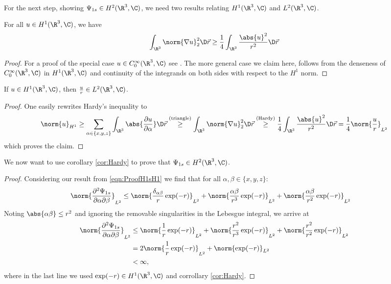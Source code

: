 For the next step, showing $\Psi_{1s} \in H^2(\R^3, \C)$,
we need two results relating $H^1(\R^3, \C)$ and $L^2(\R^3, \C)$.
\begin{prop}
	\label{prop:Hardy}
	For all $u \in H^1(\R^3, \C)$, we have
	\[ \int_{\R^3} \norm{\nabla u}_2^2 \D\vec{r}
		\geq \frac{1}{4} \int_{\R^3} \frac{\abs{u}^2}{r^2} \D\vec{r} \]
	\begin{proof}
		For a proof of the special case $u \in C_0^\infty(\R^3, \C)$
		see \cite[p. 30]{Helffer2013}.
		The more general case we claim here,
		follows from the denseness of $C_0^\infty(\R^3, \C)$ in $H^1(\R^3, \C)$
		and continuity of the integrands on both sides
		with respect to the $H^1$ norm.
	\end{proof}
\end{prop}

\begin{cor}
	\label{cor:Hardy}
	If $u \in H^1(\R^3, \C)$, then $\frac{u}{r} \in L^2(\R^3, \C)$.
	\begin{proof}
		One easily rewrites Hardy's inequality to
		\[
			\norm{u}_{H^1} \geq  \sum_{\alpha\in\{x,y,z\}} \int_{\R^3} \abs{\frac{\partial u}{\partial \alpha}} \D\vec{r}
			\stackrel{\text{(triangle)}}{\geq}
			\int_{\R^3} \norm{\nabla u}_2^2 \D\vec{r}
			\stackrel{\text{(Hardy)}}{\geq}
			\frac{1}{4} \int_{\R^3} \frac{\abs{u}^2}{r^2} \D\vec{r}
			= \frac{1}{4} \norm{\frac{u}{r}}_{L^2}
		\]
		which proves the claim.
	\end{proof}
\end{cor}

\begin{exmp}
	\label{exmp:H1sH2}
	We now want to use corollary \vref{cor:Hardy} to prove that
	$\Psi_{1s} \in H^2(\R^3,\C)$.
	\begin{proof}
		Considering our result from \eqref{eqn:ProofH1sH1}
		we find that for all $\alpha, \beta \in \{x,y,z\}$:
		\begin{align*}
			\norm{\frac{\partial^2 \Psi_{1s}}{\partial \alpha \partial \beta}}_{L^2}
			&\leq \norm{ \frac{\delta_{\alpha\beta}}{r} \exp(-r)}_{L^2}
			+ \norm{\frac{\alpha\beta}{r^3}\exp(-r)}_{L^2}
			+ \norm{\frac{\alpha\beta}{r^2}\exp(-r)}_{L^2}
		\end{align*}
		Noting $\abs{\alpha\beta} \le r^2$
		and ignoring the removable singularities in the Lebesgue integral,
		we arrive at
		\begin{align*}
			\norm{\frac{\partial^2 \Psi_{1s}}{\partial \alpha \partial \beta}}_{L^2}
			&\leq \norm{\frac{1}{r} \exp(-r)}_{L^2}
			+ \norm{\frac{r^2}{r^3}\exp(-r)}_{L^2}
			+ \norm{\frac{r^2}{r^2}\exp(-r)}_{L^2} \\
			&= 2\norm{\frac{1}{r} \exp(-r)}_{L^2} + \norm{\exp(-r)}_{L^2} \\
			&< \infty,
		\end{align*}
		where in the last line we used
		$\exp(-r) \in H^1(\R^3, \C)$ and corrollary \vref{cor:Hardy}.
\end{proof}
\end{exmp}

